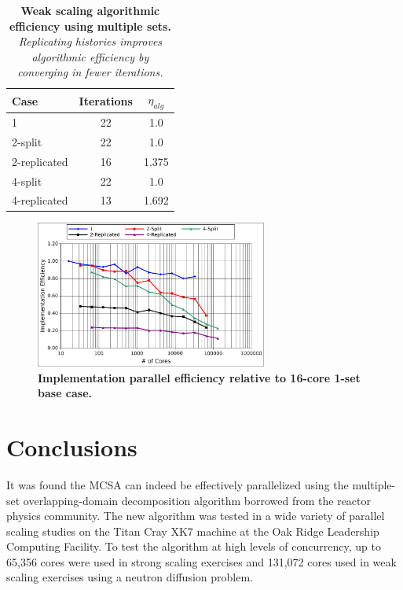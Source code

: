 \documentclass{snamc2013}
\begin{document}
\begin{table}[h!]
  \begin{center}
    \begin{tabular}{lcc}\hline\hline
      \multicolumn{1}{l}{Case}& 
      \multicolumn{1}{c}{Iterations}&
      \multicolumn{1}{c}{$\eta_{alg}$} \\\hline
      1 & 22 & 1.0 \\
      2-split & 22 & 1.0 \\
      2-replicated & 16 & 1.375 \\
      4-split & 22 & 1.0 \\
      4-replicated & 13 & 1.692 \\
      \hline\hline
    \end{tabular}
  \end{center}
  \caption{\textbf{Weak scaling algorithmic efficiency using multiple
      sets.} \textit{Replicating histories improves algorithmic
      efficiency by converging in fewer iterations.}}
  \label{tab:ms_weak_alg_eff}
\end{table}

\begin{figure}[h!]
  \begin{center}
    \includegraphics[width=3in]{titan_weak_ms_impeff.pdf}
  \end{center}
  \caption{\textbf{Implementation parallel efficiency relative to 16-core
      1-set base case.}}
  \label{fig:titan_weak_ms_impeff}
\end{figure}

\section{Conclusions}

It was found the MCSA can indeed be effectively parallelized using the
multiple-set overlapping-domain decomposition algorithm borrowed from
the reactor physics community.  The new algorithm was tested in a wide
variety of parallel scaling studies on the Titan Cray XK7 machine at
the Oak Ridge Leadership Computing Facility. To test the algorithm at
high levels of concurrency, up to 65,356 cores were used in strong
scaling exercises and 131,072 cores used in weak scaling exercises
using a neutron diffusion problem.
\end{document}
